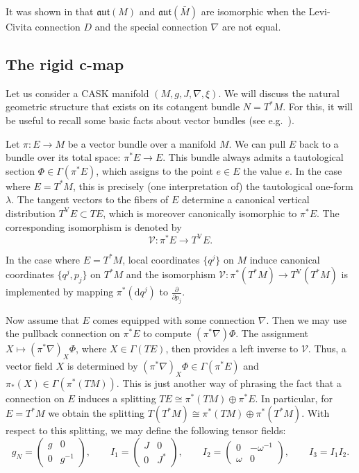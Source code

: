 \documentclass{article}
\theoremstyle{definition}
\newcommand{\calV}{\mathcal{V}}
\newcommand{\ver}{\mathrm{V}}
\newcommand{\aut}{\mathfrak{aut}}
\newcommand{\pd}[2]{\frac{\partial #1}{\partial #2}}
\renewcommand{\d}{\mathrm{d}}
\begin{document}
	It was shown in \cite[Proposition~2.18]{CST21} that $\aut(M)$ and $\aut(\bar{M})$ are isomorphic when the Levi-Civita connection $D$ and the special connection $\nabla$ are not equal.
	
	\subsection{The rigid c-map}
	
	Let us consider a CASK manifold $(M,g,J,\nabla,\xi)$. We will discuss the natural geometric structure that exists on its cotangent bundle $N=T^*M$. For this, it will be useful to recall some basic facts about vector bundles (see e.g.\ \cite{MS22}).\medskip
	
	Let $\pi:E\longrightarrow M$ be a vector bundle over a manifold $M$. We can pull $E$ back to a bundle over its total space: $\pi^*E\longrightarrow E$. This bundle always admits a tautological section $\Phi\in\Gamma(\pi^*E)$, which assigns to the point $e\in E$ the value $e$. In the case where $E=T^*M$, this is precisely (one interpretation of) the tautological one-form $\lambda$. The tangent vectors to the fibers of $E$ determine a canonical vertical distribution $T^\ver E\subset TE$, which is moreover canonically isomorphic to $\pi^*E$. The corresponding isomorphism is denoted by $$\calV:\pi^*E\longrightarrow T^\ver E.$$
	
	In the case where $E=T^*M$, local coordinates $\{q^j\}$ on $M$ induce canonical coordinates $\{q^j,p_j\}$ on $T^*M$ and the isomorphism $\calV:\pi^*(T^*M)\longrightarrow T^\ver(T^*M)$ is implemented by mapping $\pi^*(\d q^j)$ to $\pd{}{p_j}$.\medskip
	
	Now assume that $E$ comes equipped with some connection $\nabla$. Then we may use the pullback connection on $\pi^*E$ to compute $(\pi^*\nabla)\Phi$. The assignment $X\longmapsto(\pi^*\nabla)_X\Phi$, where $X\in\Gamma(TE)$, then provides a left inverse to $\calV$. Thus, a vector field $X$ is determined by $(\pi^*\nabla)_X\Phi\in\Gamma(\pi^*E)$ and $\pi_*(X)\in\Gamma(\pi^*(TM))$. This is just another way of phrasing the fact that a connection on $E$ induces a splitting $TE\cong\pi^*(TM)\oplus\pi^*E$. In particular, for $E=T^*M$ we obtain the splitting $T(T^*M)\cong\pi^*(TM)\oplus\pi^*(T^*M)$. With respect to this splitting, we may define the following tensor fields: \begin{equation}\label{eq:rigid_c-map_structure}
		g_N=\begin{pmatrix}
			g&0\\
			0&g^{-1}
		\end{pmatrix},\qquad I_1=\begin{pmatrix}
			J&0\\
			0&J^*
		\end{pmatrix},\qquad I_2=\begin{pmatrix}
			0&-\omega^{-1}\\
			\omega&0
		\end{pmatrix},\qquad I_3=I_1I_2.
	\end{equation}
\end{document}
